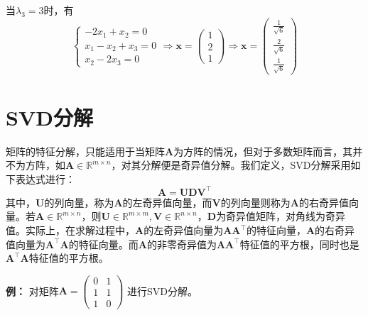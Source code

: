\documentclass[12pt,a4paper]{article}
\begin{document}
  当$\lambda _3 = 3$时，有 
  $$
  \left\{\begin{array}{c}
    -2x_1 + x_2 = 0 \\ 
    x_1 - x_2 +x_3 = 0 \\ 
    x_2 -2x_3 = 0
  \end{array}\right. \Rightarrow \mathbf{x} = \left(\begin{array}{c}
    1 \\ 
    2 \\ 
    1
  \end{array}\right) \Rightarrow \mathbf{x} = \left(\begin{array}{c}
    \frac{1}{\sqrt{6}} \\ 
    \frac{2}{\sqrt{6}} \\ 
    \frac{1}{\sqrt{6}}
  \end{array}\right)
  $$
  \section{SVD分解}
  矩阵的特征分解，只能适用于当矩阵$\mathbf{A}$为方阵的情况，但对于多数矩阵而言，其并不为方阵，如$\mathbf{A} \in \mathbb{R}^{m\times n}$，对其分解便是奇异值分解。我们定义，SVD分解采用如下表达式进行：
  \begin{equation}
    \mathbf{A} = \mathbf{UD}\mathbf{V}^{\top}
  \end{equation}
  其中，$\mathbf{U}$的列向量，称为$\mathbf{A}$的左奇异值向量，而$\mathbf{V}$的列向量则称为$\mathbf{A}$的右奇异值向量。若$\mathbf{A} \in \mathbb{R}^{m\times n}$，则$\mathbf{U} \in \mathbb{R}^{m \times m}, \mathbf{V} \in \mathbb{R}^{n \times n}$，$\mathbf{D}$为奇异值矩阵，对角线为奇异值。实际上，在求解过程中，$\mathbf{A}$的左奇异值向量为$\mathbf{AA}^{\top}$的特征向量，$\mathbf{A}$的右奇异值向量为$\mathbf{A}^{\top}\mathbf{A}$的特征向量。而$\mathbf{A}$的非零奇异值为$\mathbf{AA}^{\top}$特征值的平方根，同时也是$\mathbf{A}^{\top}\mathbf{A}$特征值的平方根。

  \textbf{例：} 对矩阵$\mathbf{A} = \left(\begin{array}{cc}
    0 & 1 \\ 
    1 & 1 \\ 
    1 & 0
  \end{array}\right)$
  进行SVD分解。
\end{document}
